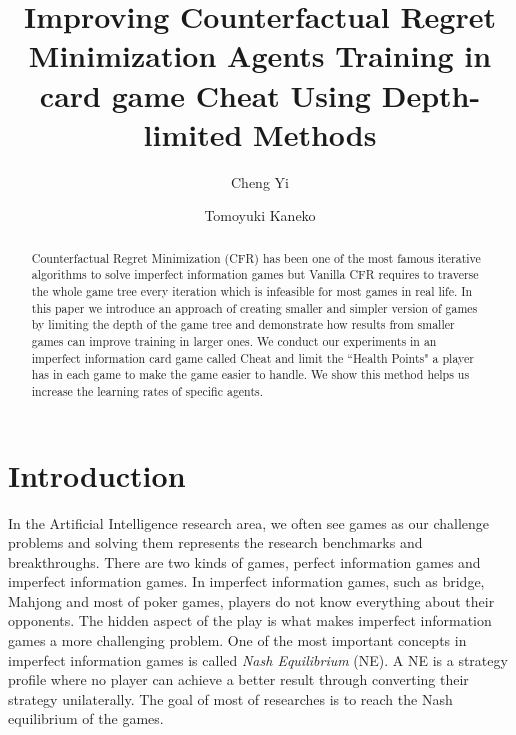 \documentclass[runningheads]{llncs}
\begin{document}
%
\title{Improving Counterfactual Regret Minimization Agents Training in card game Cheat Using Depth-limited Methods}
%
%
\author{Cheng Yi  \and
Tomoyuki Kaneko}
%
%
%
\maketitle              %
%
\begin{abstract}
Counterfactual Regret Minimization (CFR) has been one of the most famous iterative algorithms to solve imperfect information games but Vanilla CFR requires to traverse the whole game tree every iteration which is infeasible for most games in real life. In this paper we introduce an approach of creating smaller and simpler version of games by limiting the depth of the game tree and demonstrate how results from smaller games can improve training in larger ones. We conduct our experiments in an imperfect information card game called Cheat and limit the ``Health Points" a player has in each game to make the game easier to handle. We show this method helps us increase the learning rates of specific agents.

\end{abstract}
%
%
%
\section{Introduction}

    In the Artificial Intelligence research area, we often see games as our challenge problems and solving them represents the research benchmarks and breakthroughs. There are two kinds of games, perfect information games and imperfect information games. In imperfect information games, such as bridge, Mahjong and most of poker games, players do not know everything about their opponents. The hidden aspect of the play is what makes imperfect information games a more challenging problem. One of the most important concepts in imperfect information games is called \textit{Nash Equilibrium} (NE). A NE is a strategy profile where no player can achieve a better result through converting their strategy unilaterally. The goal of most of researches is to reach the Nash equilibrium of the games. 
    
\end{document}
